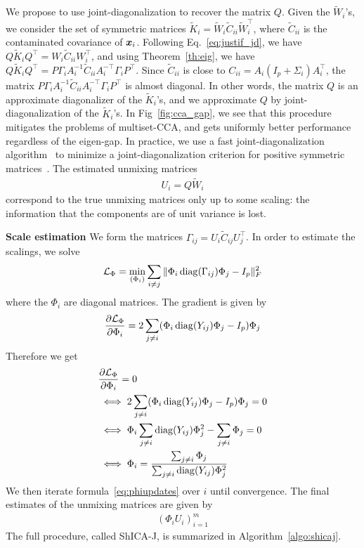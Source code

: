 We propose to use joint-diagonalization to recover the matrix $Q$. Given the $\tilde{W}_i$'s, we consider the set of symmetric matrices $\tilde{K}_i = \tilde{W}_i\tilde{C}_{ii}\tilde{W}_i^{\top}$, where $\tilde{C}_{ii}$ is the contaminated covariance of $\xb_i$. Following Eq.~\eqref{eq:justif_jd}, we have $Q\tilde{K}_iQ^{\top} = W_i \tilde{C}_{ii}W_i^{\top}$, and using Theorem~\ref{th:eig}, we have $Q\tilde{K}_iQ^{\top} = P\Gamma_i A_i^{-1}\tilde{C}_{ii}A_i^{-\top}\Gamma_iP^{\top}$. Since $\tilde{C}_{ii}$ is close to $C_{ii} = A_i (I_p + \Sigma_i)A_i^\top$, the matrix $P\Gamma_i A_i^{-1}\tilde{C}_{ii}A_i^{-\top}\Gamma_iP^{\top}$ is almost diagonal.
%
In other words, the matrix $Q$ is an approximate diagonalizer of the $\tilde{K}_i$'s, and we approximate $Q$ by joint-diagonalization of the $\tilde{K}_i$'s. In Fig~\ref{fig:cca_gap}, we see that this procedure mitigates the problems of multiset-CCA, and gets uniformly better performance regardless of the eigen-gap.
%
In practice, we use a fast joint-diagonalization
algorithm~\cite{ablin2018beyond} to minimize a joint-diagonalization criterion
for positive symmetric matrices~\cite{pham2001joint}. The estimated unmixing
matrices
\begin{align}
U_i = Q\tilde{W}_i
\end{align}
correspond to the true unmixing matrices only up to some scaling: the information that the components are of unit variance is lost.

\textbf{Scale estimation}
We form the matrices $\Gamma_{ij} = U_i\tilde{C}_{ij}U_j^\top$. In order to
estimate the scalings, we solve
\begin{align}
\loss_{\Phi} = \min_{(\Phi_i)} \sum_{i\neq j} \| \Phi_i \diag(\Gamma_{ij}) \Phi_j - I_p \|_F^2
\end{align}
where the $\Phi_i$ are diagonal matrices.
The gradient is given by
\begin{align}
  \partialfrac{\Phi_i}{\loss_{\Phi}} = 2\sum_{j \neq i} (\Phi_i \diag(Y_{ij}) \Phi_j - I_p) \Phi_j
\end{align}
Therefore we get
\begin{align}
  &\partialfrac{\Phi_i}{\loss_{\Phi}} = 0 \\
  &\iff 2\sum_{j \neq i} (\Phi_i \diag(Y_{ij}) \Phi_j - I_p) \Phi_j = 0 \\
  &\iff \Phi_i \sum_{j \neq i} \diag(Y_{ij}) \Phi_j^2 - \sum_{j \neq i} \Phi_j = 0 \\
  &\iff \Phi_i = \frac{\sum_{j \neq i} \Phi_j}{\sum_{j \neq i} \diag(Y_{ij}) \Phi_j^2}
    \label{eq:phiupdates}
\end{align}
We then iterate formula~\eqref{eq:phiupdates} over $i$ until convergence.
The final estimates of the unmixing matrices are given by
\begin{align}
  (\Phi_i U_i)_{i=1}^m
\end{align}
The full procedure, called ShICA-J, is summarized in Algorithm~\ref{algo:shicaj}.

